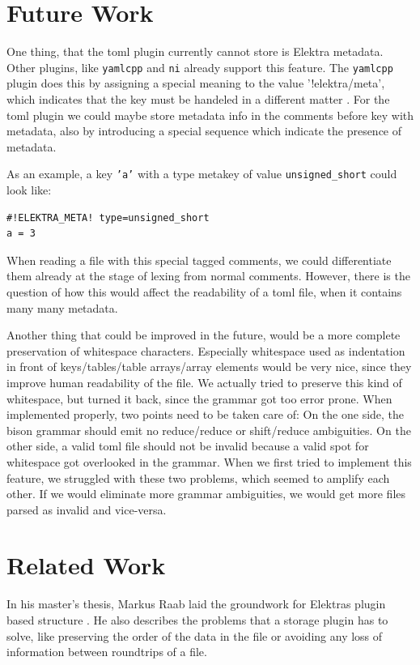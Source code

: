 \documentclass[draft,final]{vutinfth} %
\begin{document}
\chapter{Future Work}
One thing, that the \acrshort{toml} plugin currently cannot store is Elektra metadata. Other plugins, like \texttt{yamlcpp} and \texttt{ni} already support this feature.
The \texttt{yamlcpp} plugin does this by assigning a special meaning to the value '!elektra/meta', which indicates that the key must be handeled in a different matter \cite{elektrayamlcpp}.
For the \acrshort{toml} plugin we could maybe store metadata info in the comments before key with metadata, also by introducing a special sequence which indicate the presence of metadata.

As an example, a key \texttt{'a'} with a type metakey of value \texttt{unsigned\_short} could look like:
\begin{Verbatim}[frame=single, fontsize=\small]
#!ELEKTRA_META! type=unsigned_short
a = 3
\end{Verbatim}
When reading a file with this special tagged comments, we could differentiate them already at the stage of lexing from normal comments.
However, there is the question of how this would affect the readability of a \acrshort{toml} file, when it contains many many metadata.

Another thing that could be improved in the future, would be a more complete preservation of whitespace characters.
Especially whitespace used as indentation in front of keys/tables/table arrays/array elements would be very nice, since they improve human readability of the file.
We actually tried to preserve this kind of whitespace, but turned it back, since the grammar got too error prone.
When implemented properly, two points need to be taken care of:
On the one side, the bison grammar should emit no reduce/reduce or shift/reduce ambiguities.
On the other side, a valid \acrshort{toml} file should not be invalid because a valid spot for whitespace got overlooked in the grammar.
When we first tried to implement this feature, we struggled with these two problems, which seemed to amplify each other.
If we would eliminate more grammar ambiguities, we would get more files parsed as invalid and vice-versa.

\chapter{Related Work}

In his master's thesis, Markus Raab laid the groundwork for Elektras plugin based structure \cite{raabmaster}.
He also describes the problems that a storage plugin has to solve, like preserving the order of the data in the file or avoiding any loss of information between roundtrips of a file.
\end{document}
